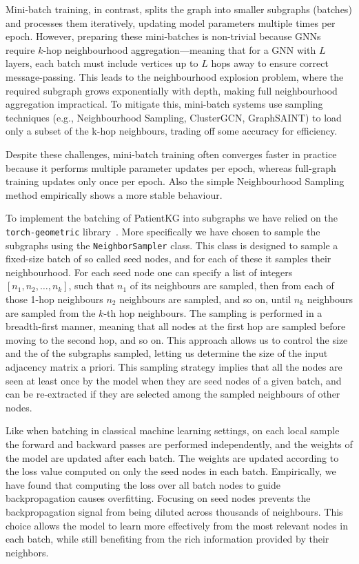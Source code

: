 Mini-batch training, in contrast, splits the graph into smaller subgraphs (batches) and processes them iteratively, updating model parameters multiple times per epoch. However, preparing these mini-batches is non-trivial because GNNs require $k$-hop neighbourhood aggregation—meaning that for a GNN with $L$ layers, each batch must include vertices up to $L$ hops away to ensure correct message-passing. This leads to the neighbourhood explosion problem, where the required subgraph grows exponentially with depth, making full neighbourhood aggregation impractical. To mitigate this, mini-batch systems use sampling techniques (e.g., Neighbourhood Sampling, ClusterGCN, GraphSAINT) to load only a subset of the k-hop neighbours, trading off some accuracy for efficiency. 

Despite these challenges, mini-batch training often converges faster in practice because it performs multiple parameter updates per epoch, whereas full-graph training updates only once per epoch. Also the simple Neighbourhood Sampling method empirically shows a more stable behaviour.

To implement the batching of PatientKG into subgraphs we have relied on the \texttt{torch-geometric} library~\cite{fey2019pytorchGeometric}. More specifically we have chosen to sample the subgraphs using the \texttt{NeighborSampler} class. This class is designed to sample a fixed-size batch of so called seed nodes, and for each of these it samples their neighbourhood. For each seed node one can specify a list of integers $[n_1, n_2, \dots, n_k]$, such that $n_1$ of its neighbours are sampled, then from each of those 1-hop neighbours $n_2$ neighbours are sampled, and so on, until $n_k$ neighbours are sampled from the $k$-th hop neighbours. The sampling is performed in a breadth-first manner, meaning that all nodes at the first hop are sampled before moving to the second hop, and so on. This approach allows us to control the size and the of the subgraphs sampled, letting us determine the size of the input adjacency matrix a priori. This sampling strategy implies that all the nodes are seen at least once by the model when they are seed nodes of a given batch, and can be re-extracted if they are selected among the sampled neighbours of other nodes. 

Like when batching in classical machine learning settings, on each local sample the forward and backward passes are performed independently, and the weights of the model are updated after each batch. The weights are updated according to the loss value computed on only the seed nodes in each batch. Empirically, we have found that computing the loss over all batch nodes to guide backpropagation causes overfitting. Focusing on seed nodes prevents the backpropagation signal from being diluted across thousands of neighbours. This choice allows the model to learn more effectively from the most relevant nodes in each batch, while still benefiting from the rich information provided by their neighbors.


